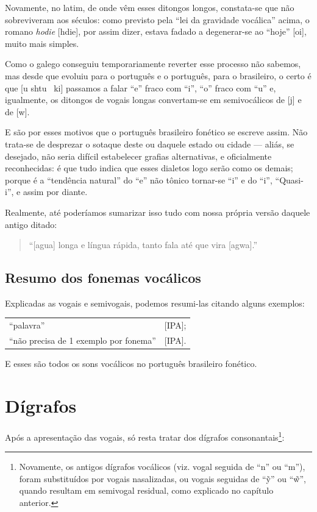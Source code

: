 \documentclass[12pt, a5paper, titlepage]{article}
\begin{document}
Novamente, no latim, de onde vêm esses ditongos longos, constata-se que não sobreviveram aos séculos: como previsto pela ``lei da gravidade vocálica'' acima, o romano \textit{hodie} [\textprimstress h\textopeno di\textsecstress e], por assim dizer, estava fadado a degenerar-se ao ``hoje'' [\textprimstress o\textyogh i], muito mais simples.

Como o galego conseguiu temporariamente reverter esse processo não sabemos, mas desde que evoluiu para o português e o português, para o brasileiro, o certo é que [u \textprimstress s\textepsilon htu \textepsilon \ ki] passamos a falar ``e'' fraco com ``i'', ``o'' fraco com ``u'' e, igualmente, os ditongos de vogais longas convertam-se em semivocálicos de [j] e de [w].

E são por esses motivos que o português brasileiro fonético se escreve assim. Não trata-se de desprezar o sotaque deste ou daquele estado ou cidade --- aliás, se desejado, não seria difícil estabelecer grafias alternativas, e oficialmente reconhecidas: é que tudo indica que esses dialetos logo serão como os demais; porque é a ``tendência natural'' do ``e'' não tônico tornar-se ``i'' e do ``i'', ``Quasi-i'', e assim por diante.

Realmente, até poderíamos sumarizar isso tudo com nossa própria versão daquele antigo ditado:
\begin{quote}
    ``[\textprimstress agua] longa e língua rápida, tanto fala até que vira [\textprimstress agwa].''
\end{quote}

\subsection{Resumo dos fonemas vocálicos}
Explicadas as vogais e semivogais, podemos resumi-las citando alguns exemplos:

\begin{center}
    \begin{tabular}{ll}
        ``palavra'' &[IPA];
        \\
        ``não precisa de 1 exemplo por fonema'' &[IPA].
    \end{tabular}
\end{center}

E esses são todos os sons vocálicos no português brasileiro fonético.

\section{Dígrafos}\label{pt.section.digraphs}
Após a apresentação das vogais, só resta tratar dos dígrafos consonantais\footnote{
    Novamente, os antigos dígrafos vocálicos (viz. vogal seguida de ``n'' ou ``m''), foram substituídos por vogais nasalizadas, ou vogais seguidas de ``\~y'' ou ``\~w'', quando resultam em semivogal residual, como explicado no capítulo anterior.
}:
\end{document}

